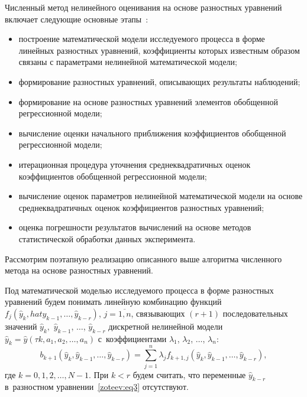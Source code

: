 Численный метод нелинейного оценивания на основе разностных уравнений включает следующие основные этапы~\cite{zot:8}:
\begin{itemize}
\item построение математической модели исследуемого процесса в форме линейных разностных уравнений, коэффициенты которых известным образом связаны с параметрами нелинейной математической модели;
\item формирование разностных уравнений, описывающих результаты наблюдений;
\item формирование на основе разностных уравнений элементов обобщенной регрессионной модели;
\item вычисление оценки начального приближения коэффициентов обобщенной регрессионной модели;
\item итерационная процедура уточнения среднеквадратичных оценок коэффициентов обобщенной регрессионной модели;
\item вычисление оценок параметров нелинейной математической модели на основе среднеквадратичных оценок коэффициентов разностных уравнений;
\item оценка погрешности результатов вычислений на основе методов статистической обработки данных эксперимента.
\end{itemize}

Рассмотрим поэтапную реализацию описанного выше алгоритма численного метода на основе разностных уравнений.

\smallskip

Под математической моделью исследуемого процесса в форме разностных уравнений будем понимать линейную комбинацию функций $f_j(\hat{y}_{k}, hat{y}_{k-1}, \dots, \hat{y}_{k-r})$, $j=\overline{1,n}$, связывающих $(r+1)$ последовательных значений $\hat{y}_{k},$ $\hat{y}_{k-1}$, $\dots$, $\hat{y}_{k-r}$ дискретной нелинейной модели $\hat{y}_k=\hat{y}(\tau k,a_1, a_2, \dots, a_n)$ с~коэффициентами $\lambda_1$, $\lambda_2$, $\dots$, $\lambda_n$:
\begin{equation}
b_{k+1}(\hat{y}_k,\hat{y}_{k-1}, \dots, \hat{y}_{k-r})=\sum_{j=1}^{n} \lambda_j f_{k+1,j}(\hat{y}_k,\hat{y}_{k-1}, \dots, \hat{y}_{k-r}), 
\label{zoteev:eq3}
\end{equation}	
где $k=0,1,2,\dots,N-1.$
При $k<r$ будем считать, что переменные $\hat{y}_{k-r}$ в~разностном уравнении~\eqref{zoteev:eq3} отсутствуют.

